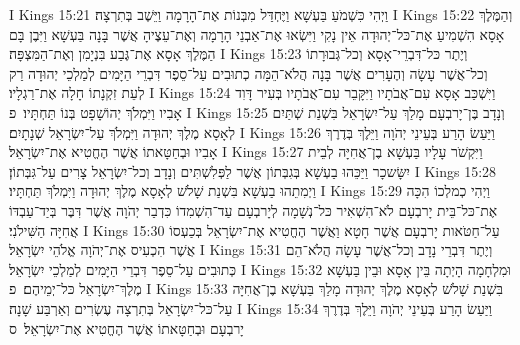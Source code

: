 I Kings 15:21	וַיְהִי כִּשְׁמֹעַ בַּעְשָׁא וַיֶּחְדַּל מִבְּנוֹת אֶת־הָרָמָה וַיֵּשֶׁב בְּתִרְצָה׃
I Kings 15:22	וְהַמֶּלֶךְ אָסָא הִשְׁמִיעַ אֶת־כּל־יְהוּדָה אֵין נָקִי וַיִּשְׂאוּ אֶת־אַבְנֵי הָרָמָה וְאֶת־עֵצֶיהָ אֲשֶׁר בָּנָה בַּעְשָׁא וַיִּבֶן בָּם הַמֶּלֶךְ אָסָא אֶת־גֶּבַע בִּנְיָמִן וְאֶת־הַמִּצְפָּה׃
I Kings 15:23	וְיֶתֶר כּל־דִּבְרֵי־אָסָא וְכל־גְּבוּרָתוֹ וְכל־אֲשֶׁר עָשָׂה וְהֶעָרִים אֲשֶׁר בָּנָה הֲלֹא־הֵמָּה כְתוּבִים עַל־סֵפֶר דִּבְרֵי הַיָּמִים לְמַלְכֵי יְהוּדָה רַק לְעֵת זִקְנָתוֹ חָלָה אֶת־רַגְלָיו׃
I Kings 15:24	וַיִּשְׁכַּב אָסָא עִם־אֲבֹתָיו וַיִּקָּבֵר עִם־אֲבֹתָיו בְּעִיר דָּוִד אָבִיו וַיִּמְלֹךְ יְהוֹשָׁפָט בְּנוֹ תַּחְתָּיו׃ {פ}
I Kings 15:25	וְנָדָב בֶּן־יָרבְעָם מָלַךְ עַל־יִשְׂרָאֵל בִּשְׁנַת שְׁתַּיִם לְאָסָא מֶלֶךְ יְהוּדָה וַיִּמְלֹךְ עַל־יִשְׂרָאֵל שְׁנָתָיִם׃
I Kings 15:26	וַיַּעַשׂ הָרַע בְּעֵינֵי יְהֹוָה וַיֵּלֶךְ בְּדֶרֶךְ אָבִיו וּבְחַטָּאתוֹ אֲשֶׁר הֶחֱטִיא אֶת־יִשְׂרָאֵל׃
I Kings 15:27	וַיִּקְשֹׁר עָלָיו בַּעְשָׁא בֶן־אֲחִיָּה לְבֵית יִשָּׂשכָר וַיַּכֵּהוּ בַעְשָׁא בְּגִבְּתוֹן אֲשֶׁר לַפְּלִשְׁתִּים וְנָדָב וְכל־יִשְׂרָאֵל צָרִים עַל־גִּבְּתוֹן׃
I Kings 15:28	וַיְמִתֵהוּ בַעְשָׁא בִּשְׁנַת שָׁלֹשׁ לְאָסָא מֶלֶךְ יְהוּדָה וַיִּמְלֹךְ תַּחְתָּיו׃
I Kings 15:29	וַיְהִי כְמלְכוֹ הִכָּה אֶת־כּל־בֵּית יָרבְעָם לֹא־הִשְׁאִיר כּל־נְשָׁמָה לְיָרבְעָם עַד־הִשְׁמִדוֹ כִּדְבַר יְהֹוָה אֲשֶׁר דִּבֶּר בְּיַד־עַבְדּוֹ אֲחִיָּה הַשִּׁילֹנִי׃
I Kings 15:30	עַל־חַטֹּאות יָרבְעָם אֲשֶׁר חָטָא וַאֲשֶׁר הֶחֱטִיא אֶת־יִשְׂרָאֵל בְּכַעְסוֹ אֲשֶׁר הִכְעִיס אֶת־יְהֹוָה אֱלֹהֵי יִשְׂרָאֵל׃
I Kings 15:31	וְיֶתֶר דִּבְרֵי נָדָב וְכל־אֲשֶׁר עָשָׂה הֲלֹא־הֵם כְּתוּבִים עַל־סֵפֶר דִּבְרֵי הַיָּמִים לְמַלְכֵי יִשְׂרָאֵל׃
I Kings 15:32	וּמִלְחָמָה הָיְתָה בֵּין אָסָא וּבֵין בַּעְשָׁא מֶלֶךְ־יִשְׂרָאֵל כּל־יְמֵיהֶם׃ {פ}
I Kings 15:33	בִּשְׁנַת שָׁלֹשׁ לְאָסָא מֶלֶךְ יְהוּדָה מָלַךְ בַּעְשָׁא בֶן־אֲחִיָּה עַל־כּל־יִשְׂרָאֵל בְּתִרְצָה עֶשְׂרִים וְאַרְבַּע שָׁנָה׃
I Kings 15:34	וַיַּעַשׂ הָרַע בְּעֵינֵי יְהֹוָה וַיֵּלֶךְ בְּדֶרֶךְ יָרבְעָם וּבְחַטָּאתוֹ אֲשֶׁר הֶחֱטִיא אֶת־יִשְׂרָאֵל׃ {ס}        
